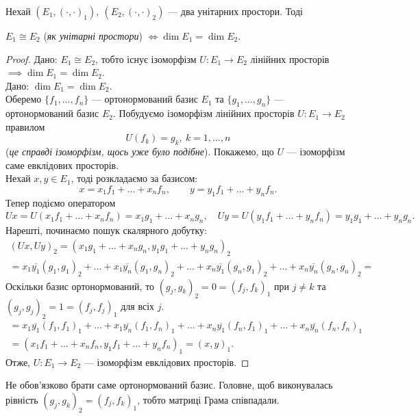 \documentclass{math_library}
\begin{document}
\begin{theorem}
Нехай $(E_1,(\cdot,\cdot)_1),\ (E_2,(\cdot,\cdot)_2)$ --- два унітарних простори. Тоді
\begin{center}
$E_1 \cong E_2$ (\textit{як унітарні простори}) $\iff \dim E_1 = \dim E_2$.
\end{center}
\end{theorem}

\begin{proof}
\rightproof Дано: $E_1 \cong E_2$, тобто існує ізоморфізм $U \colon E_1 \to E_2$ лінійних просторів $\implies \dim E_1 = \dim E_2$.
\bigskip \\
\leftproof Дано: $\dim E_1 = \dim E_2$.\\
Оберемо $\{f_1,\dots,f_n\}$ --- ортонормований базис $E_1$ та $\{g_1,\dots,g_n\}$ --- ортонормований базис $E_2$. Побудуємо ізоморфізм лінійних просторів $U \colon E_1 \to E_2$ правилом 
\[
U(f_k) = g_k,\ k = 1,\dots,n
\] 
(\textit{це справді ізоморфізм, щось уже було подібне}). Покажемо, що $U$ --- ізоморфізм саме евклідових просторів.\\
Нехай $x,y \in E_1$, тоді розкладаємо за базисом:
\[
x = x_1 f_1 + \dots + x_n f_n, \qquad y = y_1 f_1 + \dots + y_n f_n.
\]
Тепер подіємо оператором
\[
Ux = U(x_1 f_1+\dots+x_n f_n) = x_1 g_1 + \dots + x_n g_n, \quad Uy = U(y_1 f_1+\dots+y_n f_n) = y_1 g_1 + \dots + y_n g_n.
\]
Нарешті, починаємо пошук скалярного добутку:
\begin{align*}
(Ux,Uy)_2 = (x_1 g_1+\dots+x_n g_n, y_1 g_1 + \dots + y_n g_n)_2 \\
= x_1 \overline{y_1} (g_1,g_1)_2 + \dots + x_1 \overline{y_n} (g_1,g_n)_2 + \dots + x_n \overline{y_1} (g_n, g_1)_2 + \dots + x_n \overline{y_n} (g_n,g_n)_2 \boxed{=}
\end{align*}
Оскільки базис ортонормований, то $(g_j,g_k)_2 = 0 = (f_j,f_k)_1$ при $j \neq k$ та $(g_j,g_j)_2 = 1 = (f_j,f_j)_1$ для всіх $j$.
\begin{align*}
\boxed{=} x_1 \overline{y_1} (f_1,f_1)_1 + \dots + x_1 \overline{y_n} (f_1,f_n)_1 + \dots + x_n \overline{y_1} (f_n, f_1)_1 + \dots + x_n \overline{y_n} (f_n,f_n)_1 \\
= (x_1f_1+\dots+x_nf_n, y_1f_1+\dots+y_nf_n)_1 = (x,y)_1.
\end{align*}
Отже, $U \colon E_1 \to E_2$ --- ізоморфізм евклідових просторів.
\end{proof}

\begin{remark}
Не обов'язково брати саме ортонормований базис. Головне, щоб виконувалась рівність $(g_j,g_k)_2 = (f_j,f_k)_1$, тобто матриці Грама співпадали.
\end{remark}
\end{document}
